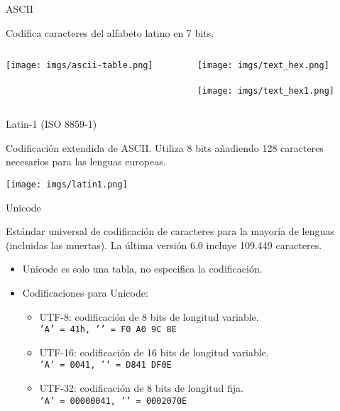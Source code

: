 \begin{frame}{ASCII}
    \begin{block}{}
        \centering Codifica caracteres del alfabeto latino en 7 bits.
    \end{block}
    \begin{columns}
    \begin{column}{0.40\textwidth}
        \texttt{[image: imgs/ascii-table.png]}
    \end{column}
    \begin{column}{0.55\textwidth}
        \centering
        \texttt{[image: imgs/text\_hex.png]} \\
        \Huge \textdownarrow \\
        \texttt{[image: imgs/text\_hex1.png]}
    \end{column}
    \end{columns}
\end{frame}

\begin{frame}{Latin-1 (ISO 8859-1)}
    \begin{block}{}
        Codificación extendida de ASCII. Utiliza 8 bits añadiendo 128 caracteres necesarios para las lenguas europeas.
    \end{block}
    \centering\texttt{[image: imgs/latin1.png]}
\end{frame}

\begin{frame}{Unicode}
    \begin{block}{}
        Estándar universal de codificación de caracteres para la mayoría de lenguas (incluidas las muertas). La última versión 6.0 incluye 109.449 caracteres.
    \end{block}

    \begin{itemize}
        \item<2-> Unicode es solo una tabla, no especifica la codificación.
        \item<3-> Codificaciones para Unicode:
        \begin{itemize}
            \item<4-> UTF-8: codificación de 8 bits de longitud variable.\\ \texttt{'A' = 41h, '}\texttt{' = F0 A0 9C 8E}
            \item<5-> UTF-16: codificación de 16 bits de longitud variable. \\ \texttt{'A' = 0041, '}\texttt{' = D841 DF0E}
            \item<6-> UTF-32: codificación de 8 bits de longitud fija. \\ \texttt{'A' = 00000041, '}\texttt{' = 0002070E}
        \end{itemize}
    \end{itemize}
\end{frame}

